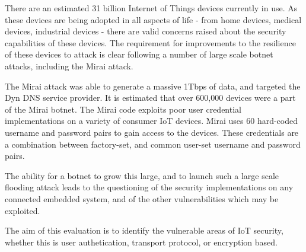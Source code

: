 There are an estimated 31 billion Internet of Things devices currently in
use\cite{jan13}.
As these devices are being adopted in all aspects of life - from home devices,
medical devices, industrial devices - there are valid concerns raised about the
security capabilities of these devices. The requirement for improvements to the
resilience of these devices to attack is clear following a number of large scale
botnet attacks, including the Mirai attack.

The Mirai attack was able to generate a massive 1Tbps of data, and targeted the
Dyn DNS service provider. It is estimated that over 600,000 devices were
a part of the Mirai botnet. The Mirai code exploits poor user credential
implementations on a variety of consumer IoT devices. Mirai uses 60 hard-coded
username and password pairs to gain access to the devices. These credentials are
a combination between factory-set, and common user-set username and password
pairs.

The ability for a botnet to grow this large, and to launch such a large scale
flooding attack leads to the questioning of the security implementations on any
connected embedded system, and of the other vulnerabilities which may be
exploited.

The aim of this evaluation is to identify the vulnerable areas of IoT security,
whether this is user authetication, transport protocol, or encryption based.
